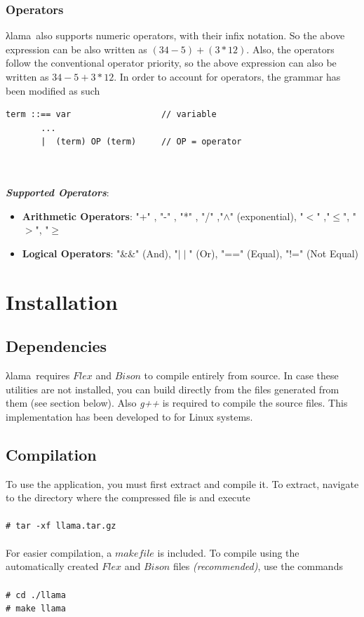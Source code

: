 \documentclass[a4paper]{article}
\newcommand{\shellcmd}[1]{\indent\indent\texttt{\footnotesize\# #1}}
\newcommand{\intr}{\textgreek{λ}lama\ }
\begin{document}
\subsubsection{Operators}

\intr also supports numeric operators, with their infix notation. So the above expression can be also written as $(34 - 5) + (3 * 12)$. Also, the operators follow the conventional operator priority, so the above expression can also be written as $34-5+3*12$.
In order to account for operators, the grammar has been modified as such
\begin{lstlisting}
term ::== var                  // variable
       ...
       |  (term) OP (term)     // OP = operator
\end{lstlisting}
~\\ \\ 
\noindent \textbf{\textit{Supported Operators}}:\ \\ 

\begin{itemize}
\item \textbf{Arithmetic Operators}: "+" , "-" , "*" , "/" ,"$\wedge $" (exponential), "$<$" ,"$\leq $", "$>$", "$\geq $
\item \textbf{Logical Operators}: "\&\&" (And), "$\mid \mid$" (Or), "==" (Equal), "!=" (Not Equal)
\end{itemize}
\section{Installation}
\subsection{Dependencies}

\intr requires $Flex$ and $Bison$ to compile entirely from source. In case these utilities are not installed, you can build directly from the files generated from them (see section below). Also \textit{g++} is required to compile the source files. This implementation has been developed to for Linux systems.

\subsection{Compilation}

To use the application, you must first extract and compile it. To extract, navigate to the directory where the compressed file is and execute
\\ \\ 
\shellcmd{tar -xf llama.tar.gz}
\\ \\
For easier compilation, a $makefile$ is included. To compile using the automatically created $Flex$ and $Bison$ files \textit{(recommended)}, use the commands
\\ \\ 
\shellcmd{cd ./llama}\\
\shellcmd{make llama}
\\
\end{document}
